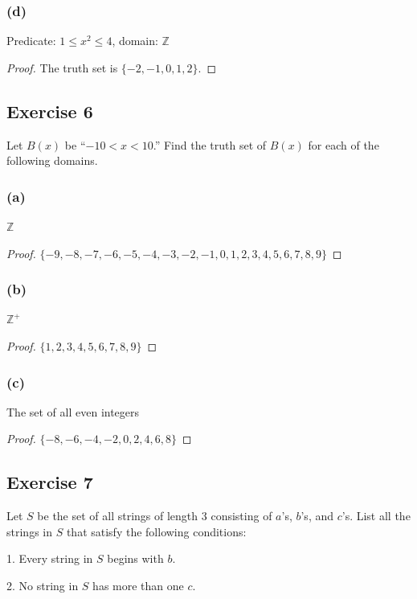 \documentclass[14pt]{extarticle}
\newcommand{\Z}{\mathbb{Z}}
\begin{document}
\subsubsection{(d)}
Predicate: $1 \leq x^2 \leq 4$, domain: $\Z$

\begin{proof}
The truth set is $\{-2, -1, 0, 1, 2\}$.
\end{proof}

\subsection{Exercise 6}
Let $B(x)$ be “$-10 < x < 10$.” Find the truth set of $B(x)$ for each of the following domains.

\subsubsection{(a)}
$\Z$

\begin{proof}
$\{-9, -8, -7, -6, -5, -4, -3, -2, -1, 0, 1, 2, 3, 4, 5, 6, 7, 8, 9\}$
\end{proof}

\subsubsection{(b)}
$\Z^+$
 
\begin{proof}
$\{1, 2, 3, 4, 5, 6, 7, 8, 9\}$
\end{proof}

\subsubsection{(c)}
The set of all even integers

\begin{proof}
$\{-8, -6, -4, -2, 0, 2, 4, 6, 8\}$
\end{proof}

\subsection{Exercise 7}
Let $S$ be the set of all strings of length 3 consisting of $a$’s, $b$’s, and $c$’s. List all the strings in $S$ that satisfy the following conditions:

1. Every string in $S$ begins with $b$.

2. No string in $S$ has more than one $c$.
\end{document}
